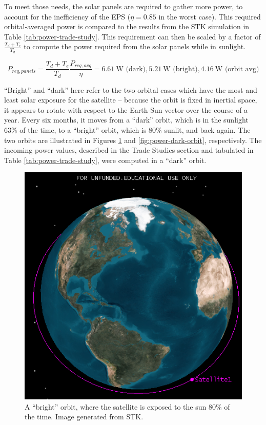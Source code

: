 \documentclass[12pt]{article}
\begin{document}
To meet those needs, the solar panels are required to gather more power, to account for the inefficiency of the EPS ($\eta = 0.85$ in the worst case\cite[p.~9]{EPS-manual}).  This required orbital-averaged power is compared to the results from the STK simulation in Table \ref{tab:power-trade-study}.  This requirement can then be scaled by a factor of $\frac{T_d + T_e}{T_d}$ to compute the power required from the solar panels while in sunlight.

\begin{equation}
P_{req,panels} = \frac{T_d + T_e}{T_d}\frac{P_{req,avg}}{\eta} = 6.61 \ \text{W (dark)}, 5.21 \ \text{W (bright)}, 4.16 \ \text{W (orbit avg)}
\label{eq:power-required-panels}
\end{equation}

``Bright'' and ``dark'' here refer to the two orbital cases which have the most and least solar exposure for the satellite – because the orbit is fixed in inertial space, it appears to rotate with respect to the Earth-Sun vector over the course of a year.  Every six months, it moves from a ``dark'' orbit, which is in the sunlight 63\% of the time, to a ``bright'' orbit, which is 80\% sunlit, and back again.  The two orbits are illustrated in Figures \ref{fig:power-bright-orbit} and \ref{fig:power-dark-orbit}, respectively.  The incoming power values, described in the Trade Studies section and tabulated in Table \ref{tab:power-trade-study}, were computed in a ``dark'' orbit.

\begin{figure}[ht]%
\centering
\includegraphics{images/power-bright-orbit}%
\caption{A ``bright'' orbit, where the satellite is exposed to the sun 80\% of the time.  Image generated from STK.}%
\label{fig:power-bright-orbit}%
\end{figure}
\end{document}
